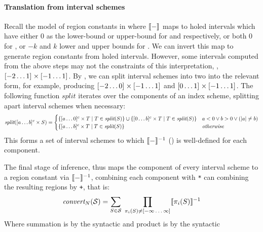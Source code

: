 \paragraph{Translation from interval schemes}

Recall the model of region constants in 
where $\llbracket{} {-} \rrbracket{}$ maps to holed intervals which have either $0$ as
the lower-bound or upper-bound for  and
 respectively, or both $0$ for , or
$-k$ and $k$ lower and upper bounds for . We can
invert this map to generate region constants from holed
intervals. However, some intervals computed from the above steps
may not the constraints of this interpretation,
\eg{}, $\textnormal{$\lbrack-2\dots1\rbrack^{}$} \times \textnormal{$\lbrack-1\dots1\rbrack^{}$}$.  By
, we can split interval schemes into two into
the relevant form, for example, producing
$\textnormal{$\lbrack-2\dots0\rbrack^{}$} \times \textnormal{$\lbrack-1\dots1\rbrack^{}$}$ and
$\textnormal{$\lbrack0\dots1\rbrack^{}$} \times \textnormal{$\lbrack-1\dots1\rbrack^{}$}$. 
The following function
$\textit{split}$ iterates over the components of an index scheme,
splitting apart interval schemes when necessary:
%
\begin{align*}
  \textit{split}(\textnormal{$\lbrack a\dots b\rbrack^{c}$} \times S) =
   \begin{cases}
  \{ \textnormal{$\lbrack a\dots0\rbrack^{c}$} \times T \mid T \in \textit{split}(S) \}
  \cup
  \{ \textnormal{$\lbrack0\dots b\rbrack^{c}$} \times T \mid T \in \textit{split}(S) \}
  & a < 0 \vee b > 0 \vee (|a| \neq b) \\
  \{ \textnormal{$\lbrack a\dots b\rbrack^{c}$} \times T \mid T \in \textit{split}(S) \}
  & \textit{otherwise}
\end{cases}
\end{align*}
%
This forms a set of interval schemes to which $\llbracket{} {-} \rrbracket{}^{-1}$
() is well-defined for each component.

The final stage of inference, thus maps the component
of every interval scheme to a region constant via $\llbracket{} {-} \rrbracket{}^{-1}$,
combining each component with \texttt{*} can combining the
resulting regions by \texttt{+}, that is:
%
%
\begin{align}
\textit{convert}_N(\mathcal{S}) = \sum_{S \in \mathcal{S}} \; \prod_{\pi_i(S) \neq
  \textnormal{$\lbrack-\infty\dots\infty\rbrack^{}$}} \llbracket{} {\pi_i(S)} \rrbracket{}^{-1}
  \label{eq:convert}
\end{align}
%
Where summation is by the syntactic \term{+} and product is by the
syntactic \term{*}


